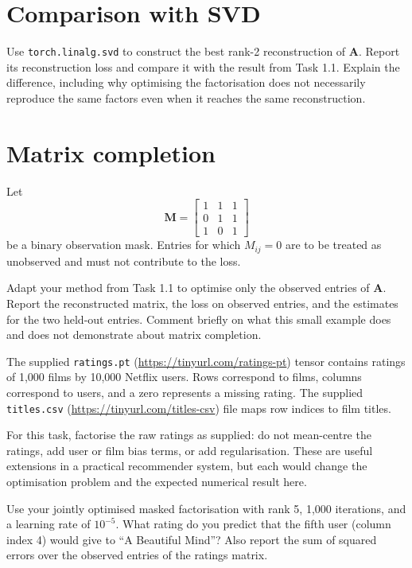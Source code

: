 \documentclass[a4paper]{article}
\begin{document}
\section{Comparison with SVD}

\begin{tcolorbox}[parbox=false,title=3.1 Compare with a truncated SVD (2 marks)]
Use \texttt{torch.linalg.svd} to construct the best rank-2 reconstruction of $\bm A$. Report its reconstruction loss and compare it with the result from Task 1.1. Explain the difference, including why optimising the factorisation does not necessarily reproduce the same factors even when it reaches the same reconstruction.
\end{tcolorbox}

\section{Matrix completion}

Let
\begin{equation*}
\bm M=
\begin{bmatrix}
1&1&1\\
0&1&1\\
1&0&1
\end{bmatrix}
\end{equation*}
be a binary observation mask. Entries for which $M_{ij}=0$ are to be treated as unobserved and must not contribute to the loss.

\begin{tcolorbox}[parbox=false,title=4.1 Complete a partially observed matrix (2 marks)]
Adapt your method from Task 1.1 to optimise only the observed entries of $\bm A$. Report the reconstructed matrix, the loss on observed entries, and the estimates for the two held-out entries. Comment briefly on what this small example does and does not demonstrate about matrix completion.
\end{tcolorbox}

\begin{tcolorbox}[parbox=false,title=4.2 Predict a movie rating (1 mark)]
The supplied \texttt{ratings.pt} (\url{https://tinyurl.com/ratings-pt}) tensor contains ratings of 1,000 films by 10,000 Netflix users. Rows correspond to films, columns correspond to users, and a zero represents a missing rating. The supplied \texttt{titles.csv} (\url{https://tinyurl.com/titles-csv}) file maps row indices to film titles.

For this task, factorise the raw ratings as supplied: do not mean-centre the ratings, add user or film bias terms, or add regularisation. These are useful extensions in a practical recommender system, but each would change the optimisation problem and the expected numerical result here.

Use your jointly optimised masked factorisation with rank 5, 1,000 iterations, and a learning rate of $10^{-5}$. What rating do you predict that the fifth user (column index 4) would give to ``A Beautiful Mind''? Also report the sum of squared errors over the observed entries of the ratings matrix.
\end{tcolorbox}
\end{document}

